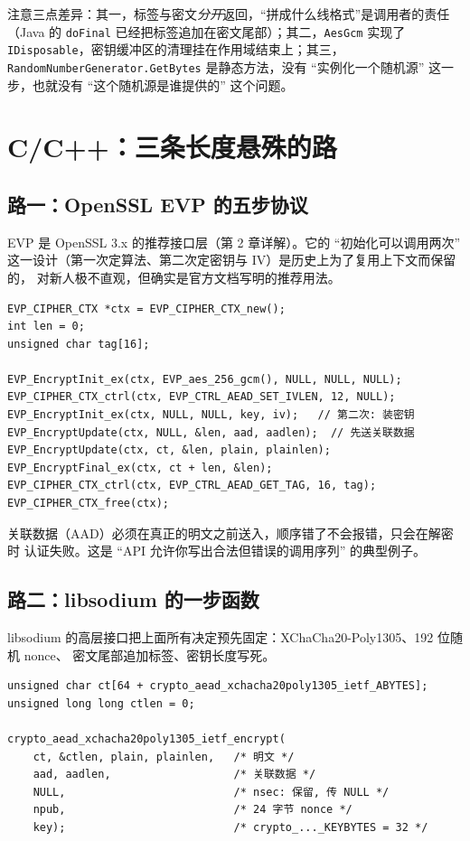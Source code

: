 \documentclass[12pt,a4paper,fontset=fandol]{ctexbook}
\newcommand{\Tp}[1]{\texttt{#1}}
\newcommand{\CppJava}{C/C++}
\begin{document}
注意三点差异：其一，标签与密文\emph{分开}返回，``拼成什么线格式''是调用者的责任
（Java 的 \Tp{doFinal} 已经把标签追加在密文尾部）；其二，\Tp{AesGcm} 实现了
\Tp{IDisposable}，密钥缓冲区的清理挂在作用域结束上；其三，
\Tp{RandomNumberGenerator.GetBytes} 是静态方法，没有 ``实例化一个随机源''
这一步，也就没有 ``这个随机源是谁提供的'' 这个问题。

\section{\CppJava{}：三条长度悬殊的路}

\subsection{路一：OpenSSL EVP 的五步协议}

EVP 是 OpenSSL 3.x 的推荐接口层（第 2 章详解）。它的 ``初始化可以调用两次''
这一设计（第一次定算法、第二次定密钥与 IV）是历史上为了复用上下文而保留的，
对新人极不直观，但确实是官方文档写明的推荐用法。

\begin{lstlisting}[caption={C/C++ 路一：OpenSSL EVP 的完整五步},
    basicstyle=\small\ttfamily]
EVP_CIPHER_CTX *ctx = EVP_CIPHER_CTX_new();
int len = 0;
unsigned char tag[16];

EVP_EncryptInit_ex(ctx, EVP_aes_256_gcm(), NULL, NULL, NULL);
EVP_CIPHER_CTX_ctrl(ctx, EVP_CTRL_AEAD_SET_IVLEN, 12, NULL);
EVP_EncryptInit_ex(ctx, NULL, NULL, key, iv);   // 第二次: 装密钥
EVP_EncryptUpdate(ctx, NULL, &len, aad, aadlen);  // 先送关联数据
EVP_EncryptUpdate(ctx, ct, &len, plain, plainlen);
EVP_EncryptFinal_ex(ctx, ct + len, &len);
EVP_CIPHER_CTX_ctrl(ctx, EVP_CTRL_AEAD_GET_TAG, 16, tag);
EVP_CIPHER_CTX_free(ctx);
\end{lstlisting}

关联数据（AAD）必须在真正的明文之前送入，顺序错了不会报错，只会在解密时
认证失败。这是 ``API 允许你写出合法但错误的调用序列'' 的典型例子。

\subsection{路二：libsodium 的一步函数}

libsodium 的高层接口把上面所有决定预先固定：XChaCha20-Poly1305、192 位随机 nonce、
密文尾部追加标签、密钥长度写死。

\begin{lstlisting}[caption={C/C++ 路二：libsodium 单函数完成同一件事}]
unsigned char ct[64 + crypto_aead_xchacha20poly1305_ietf_ABYTES];
unsigned long long ctlen = 0;

crypto_aead_xchacha20poly1305_ietf_encrypt(
    ct, &ctlen, plain, plainlen,   /* 明文 */
    aad, aadlen,                   /* 关联数据 */
    NULL,                          /* nsec: 保留, 传 NULL */
    npub,                          /* 24 字节 nonce */
    key);                          /* crypto_..._KEYBYTES = 32 */
\end{lstlisting}
\end{document}
